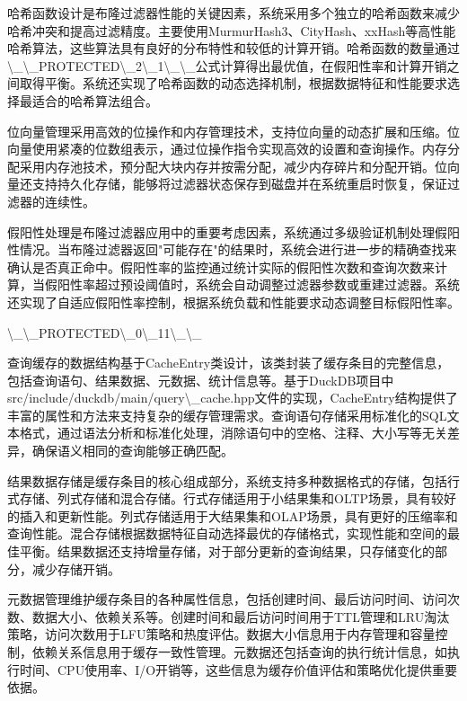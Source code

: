 哈希函数设计是布隆过滤器性能的关键因素，系统采用多个独立的哈希函数来减少哈希冲突和提高过滤精度。主要使用MurmurHash3、CityHash、xxHash等高性能哈希算法，这些算法具有良好的分布特性和较低的计算开销。哈希函数的数量通过\textbackslash{}_\textbackslash{}_PROTECTED\textbackslash{}_2\textbackslash{}_1\textbackslash{}_\textbackslash{}_公式计算得出最优值，在假阳性率和计算开销之间取得平衡。系统还实现了哈希函数的动态选择机制，根据数据特征和性能要求选择最适合的哈希算法组合。

位向量管理采用高效的位操作和内存管理技术，支持位向量的动态扩展和压缩。位向量使用紧凑的位数组表示，通过位操作指令实现高效的设置和查询操作。内存分配采用内存池技术，预分配大块内存并按需分配，减少内存碎片和分配开销。位向量还支持持久化存储，能够将过滤器状态保存到磁盘并在系统重启时恢复，保证过滤器的连续性。

假阳性处理是布隆过滤器应用中的重要考虑因素，系统通过多级验证机制处理假阳性情况。当布隆过滤器返回"可能存在"的结果时，系统会进行进一步的精确查找来确认是否真正命中。假阳性率的监控通过统计实际的假阳性次数和查询次数来计算，当假阳性率超过预设阈值时，系统会自动调整过滤器参数或重建过滤器。系统还实现了自适应假阳性率控制，根据系统负载和性能要求动态调整目标假阳性率。

\textbackslash{}_\textbackslash{}_PROTECTED\textbackslash{}_0\textbackslash{}_11\textbackslash{}_\textbackslash{}_

查询缓存的数据结构基于CacheEntry类设计，该类封装了缓存条目的完整信息，包括查询语句、结果数据、元数据、统计信息等。基于DuckDB项目中src/include/duckdb/main/query\textbackslash{}_cache.hpp文件的实现，CacheEntry结构提供了丰富的属性和方法来支持复杂的缓存管理需求。查询语句存储采用标准化的SQL文本格式，通过语法分析和标准化处理，消除语句中的空格、注释、大小写等无关差异，确保语义相同的查询能够正确匹配。

结果数据存储是缓存条目的核心组成部分，系统支持多种数据格式的存储，包括行式存储、列式存储和混合存储。行式存储适用于小结果集和OLTP场景，具有较好的插入和更新性能。列式存储适用于大结果集和OLAP场景，具有更好的压缩率和查询性能。混合存储根据数据特征自动选择最优的存储格式，实现性能和空间的最佳平衡。结果数据还支持增量存储，对于部分更新的查询结果，只存储变化的部分，减少存储开销。

元数据管理维护缓存条目的各种属性信息，包括创建时间、最后访问时间、访问次数、数据大小、依赖关系等。创建时间和最后访问时间用于TTL管理和LRU淘汰策略，访问次数用于LFU策略和热度评估。数据大小信息用于内存管理和容量控制，依赖关系信息用于缓存一致性管理。元数据还包括查询的执行统计信息，如执行时间、CPU使用率、I/O开销等，这些信息为缓存价值评估和策略优化提供重要依据。

